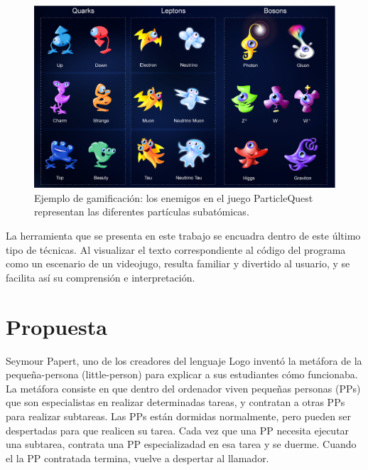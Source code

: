 \documentclass{llncs}
\begin{document}
\begin{figure}[ht]
\begin{center}
\includegraphics[scale=0.3]{images/particlequest.eps}
\caption{Ejemplo de gamificación: los enemigos en el juego ParticleQuest representan las diferentes partículas subatómicas.
\label{fig:particlequest}}
\end{center}
\end{figure}

La herramienta que se presenta en este trabajo se encuadra dentro de este último tipo de técnicas. Al visualizar el texto correspondiente al código del programa como un escenario de un videojugo, resulta familiar y divertido al usuario, y se facilita así su comprensión e interpretación.






\section{Propuesta}
\label{sec:proposal}

Seymour Papert, uno de los creadores del lenguaje Logo inventó la metáfora de la pequeña-persona (little-person) para explicar a sus estudiantes cómo funcionaba. La metáfora consiste en que dentro del ordenador viven pequeñas personas (PPs) que son especialistas en realizar determinadas tareas, y contratan a otras PPs para realizar subtareas. Las PPs están dormidas normalmente, pero pueden ser despertadas para que realicen su tarea. Cada vez que una PP necesita ejecutar una subtarea, contrata una PP especializadad en esa tarea y se duerme. Cuando el la PP contratada termina, vuelve a despertar al llamador. 
\end{document}
